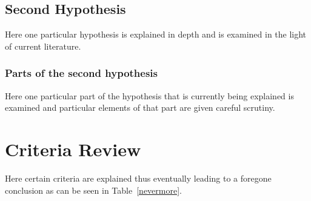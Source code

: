 
\subsection{Second Hypothesis}

Here one particular hypothesis is explained in depth
and is examined in the light of current literature.

\subsubsection{Parts of the second hypothesis}

Here one particular part of the hypothesis that is 
currently being explained is examined and particular
elements of that part are given careful scrutiny.

\section{Criteria Review}

Here certain criteria are explained thus eventually
leading to a foregone conclusion as can be seen in
Table~\ref{nevermore}.

\begin{table}[h!tb] \centering
\setlength{\captionwidth}{3.5 in}
\label{nevermore}

\vspace{ 2 in}
\end{table}

